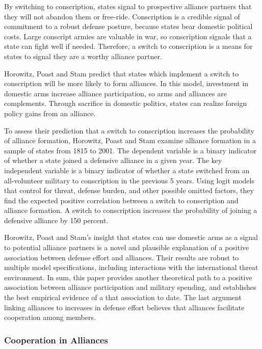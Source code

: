 \documentclass[12pt]{article}
\begin{document}
By switching to conscription, states signal to prospective alliance partners that they will not abandon them or free-ride. 
Conscription is a credible signal of commitment to a robust defense posture, because states bear domestic political costs.
Large conscript armies are valuable in war, so conscription signals that a state can fight well if needed. 
Therefore, a switch to conscription is a means for states to signal they are a worthy alliance partner. 


Horowitz, Poast and Stam predict that states which implement a switch to conscription will be more likely to form alliances. 
In this model, investment in domestic arms increase alliance participation, so arms and alliances are complements. 
Through sacrifice in domestic politics, states can realize foreign policy gains from an alliance. 


To assess their prediction that a switch to conscription increases the probability of alliance formation, Horowitz, Poast and Stam examine alliance formation in a sample of states from 1815 to 2001. 
The dependent variable is a binary indicator of whether a state joined a defensive alliance in a given year. 
The key independent variable is a binary indicator of whether a state switched from an all-volunteer military to conscription in the previous 5 years. 
Using logit models that control for threat, defense burden, and other possible omitted factors, they find the expected positive correlation between a switch to conscription and alliance formation. 
A switch to conscription increases the probability of joining a defensive alliance by 150 percent. 


Horowitz, Poast and Stam's insight that states can use domestic arms as a signal to potential alliance partners is a novel and plausible explanation of a positive association between defense effort and alliances. 
Their results are robust to multiple model specifications, including interactions with the international threat environment. 
In sum, this paper provides another theoretical path to a positive association between alliance participation and military spending, and establishes the best empirical evidence of a that association to date. 
The last argument linking alliances to increases in defense effort believes that alliances facilitate cooperation among members.  



\subsubsection{Cooperation in Alliances} 
\end{document}
